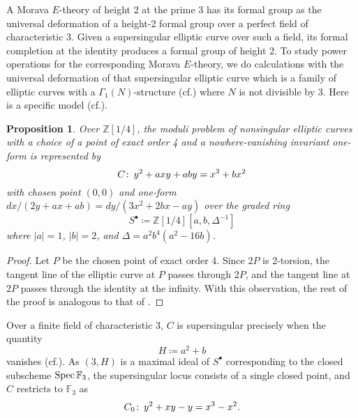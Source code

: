 \documentclass{gtpart}
\newtheorem{prop}[thm]{Proposition}
\theoremstyle{definition}
\theoremstyle{remark}
\def\co{\colon\thinspace}
\newcommand{\mb}[1]{\mathbb{#1}}
\newcommand{\Spec}{{\rm Spec\thinspace}}
\newcommand{\cf}{cf.\thinspace}
\newcommand{\BF}{{\mb F}}
\newcommand{\BZ}{{\mb Z}}
\newcommand{\G}{\Gamma}
\newcommand{\s}{S^\bullet}
\begin{document}
A Morava $E$-theory of height 2 at the prime 3 has its formal group as 
the universal deformation of a height-2 formal group over a perfect field of characteristic 3.  
Given a supersingular elliptic curve over such a field, 
its formal completion at the identity produces a formal group of height 2.  
To study power operations for the corresponding Morava $E$-theory, 
we do calculations with the universal deformation of that supersingular elliptic curve 
which is a family of elliptic curves with a $\G_1(N)$-structure (\cf \cite[Section 3.2]{KM}) where $N$ is not divisible by 3.  
Here is a specific model (\cf \cite[4(4.6a)]{ec}).  

\begin{prop}
\label{prop:C}
 Over $\BZ [1/4]$, the moduli problem of nonsingular elliptic curves with a choice of 
 a point of exact order 4 and a nowhere-vanishing invariant one-form is represented by 
 \begin{equation}
 \label{Cxy}
  C \co y^2 + a x y + a b y = x^3 + b x^2 
 \end{equation}
 with chosen point $(0,0)$ and one-form $dx / (2 y + a x + a b) = dy / (3 x^2 + 2 b x - a y)$ 
 over the graded ring 
 \[
  \s \coloneqq \BZ [1/4] [a, b, \Delta^{-1}] 
 \]
 where $|a| = 1$, $|b| = 2$, and $\Delta = a^2 b^4 (a^2 - 16 b)$.  
\end{prop}
\begin{proof}
 Let $P$ be the chosen point of exact order 4.  
 Since $2P$ is 2-torsion, the tangent line of the elliptic curve at $P$ passes through $2P$, 
 and the tangent line at $2P$ passes through the identity at the infinity.  
 With this observation, the rest of the proof is analogous to that of \cite[Proposition 3.2]{tmf3}.  
\end{proof}

Over a finite field of characteristic 3, $C$ is supersingular precisely when the quantity 
\begin{equation}
\label{H}
 H \coloneqq a^2 + b 
\end{equation}
vanishes (\cf \cite[V.4.1a]{AEC}).  
As $(3,H)$ is a maximal ideal of $\s$ corresponding to the closed subscheme $\Spec \BF_3$, 
the supersingular locus consists of a single closed point, 
and $C$ restricts to $\BF_3$ as 
\[
 C_0 \co y^2 + x y - y = x^3 - x^2.  
\]
\end{document}
